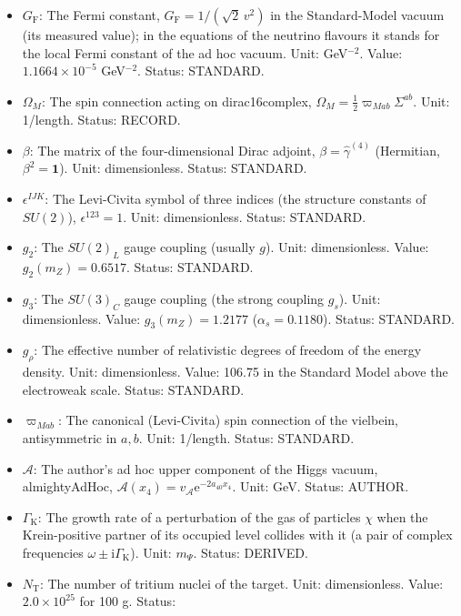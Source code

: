 \documentclass[
  10pt,
]{article}
\providecommand{\tightlist}{%
  \setlength{\itemsep}{0pt}\setlength{\parskip}{0pt}}
\begin{document}
\begin{itemize}
\tightlist
\item
  \(G_{\mathrm{F}}\): The Fermi constant,
  \(G_{\mathrm{F}} = 1/(\sqrt2\,v^2)\) in the Standard-Model vacuum (its
  measured value); in the equations of the neutrino flavours it stands
  for the local Fermi constant of the ad hoc vacuum. Unit: GeV\(^{-2}\).
  Value: \(1.1664\times10^{-5}\) GeV\(^{-2}\). Status: STANDARD.
\item
  \(\Omega_M\): The spin connection acting on dirac16complex,
  \(\Omega_M = \frac12\varpi_{Mab}\Sigma^{ab}\). Unit: 1/length. Status:
  RECORD.
\item
  \(\beta\): The matrix of the four-dimensional Dirac adjoint,
  \(\beta = \hat\gamma^{(4)}\) (Hermitian, \(\beta^2 = \mathbf{1}\)).
  Unit: dimensionless. Status: STANDARD.
\item
  \(\epsilon^{IJK}\): The Levi-Civita symbol of three indices (the
  structure constants of \(SU(2)\)), \(\epsilon^{123} = 1\). Unit:
  dimensionless. Status: STANDARD.
\item
  \(g_2\): The \(SU(2)_L\) gauge coupling (usually \(g\)). Unit:
  dimensionless. Value: \(g_2(m_Z) = 0.6517\). Status: STANDARD.
\item
  \(g_3\): The \(SU(3)_C\) gauge coupling (the strong coupling \(g_s\)).
  Unit: dimensionless. Value: \(g_3(m_Z) = 1.2177\)
  (\(\alpha_s = 0.1180\)). Status: STANDARD.
\item
  \(g_\rho\): The effective number of relativistic degrees of freedom of
  the energy density. Unit: dimensionless. Value: 106.75 in the Standard
  Model above the electroweak scale. Status: STANDARD.
\item
  \(\varpi_{Mab}\): The canonical (Levi-Civita) spin connection of the
  vielbein, antisymmetric in \(a, b\). Unit: 1/length. Status: STANDARD.
\item
  \(\mathcal{A}\): The author's ad hoc upper component of the Higgs
  vacuum, almightyAdHoc,
  \(\mathcal{A}(x_4) = v_{\mathcal{A}}\mathrm{e}^{-2a_{40}x_4}\). Unit:
  GeV. Status: AUTHOR.
\item
  \(\Gamma_{\mathrm{K}}\): The growth rate of a perturbation of the gas
  of particles \(\chi\) when the Krein-positive partner of its occupied
  level collides with it (a pair of complex frequencies
  \(\omega \pm \mathrm{i}\Gamma_{\mathrm{K}}\)). Unit: \(m_\Psi\).
  Status: DERIVED.
\item
  \(N_{\mathrm{T}}\): The number of tritium nuclei of the target. Unit:
  dimensionless. Value: \(2.0\times10^{25}\) for 100 g. Status:

\end{itemize}
\end{document}
